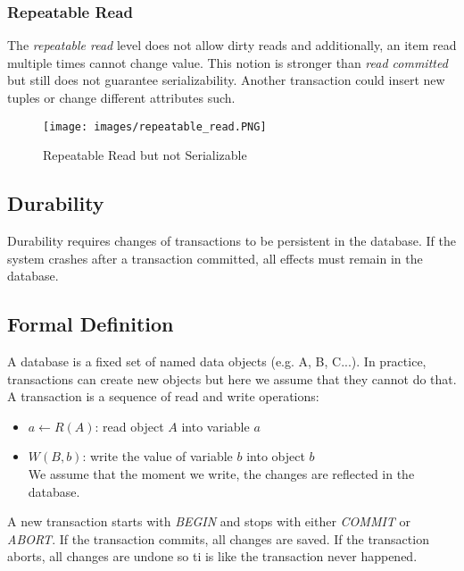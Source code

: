 \subsubsection{Repeatable Read}
The \textit{repeatable read} level does not allow dirty reads and additionally, an item read multiple times cannot change value. This notion is stronger than \textit{read committed} but still does not guarantee serializability. Another transaction could insert new tuples or change different attributes such. 
\begin{figure}[H]
\centering
\texttt{[image: images/repeatable\_read.PNG]}
\label{repeatable_read.PNG}
\caption{Repeatable Read but not Serializable}
\end{figure}

\subsection{Durability}
Durability requires changes of transactions to be persistent in the database. If the system crashes after a transaction committed, all effects must remain in the database.

\subsection{Formal Definition}
A database is a fixed set of named data objects (e.g. A, B, C...). In practice, transactions can create new objects but here we assume that they cannot do that. A transaction is a sequence of read and write operations:
\begin{itemize}
\item $a \gets R(A)$: read object $A$ into variable $a$
\item $W(B, b)$: write the value of variable $b$ into object $b$\\
We assume that the moment we write, the changes are reflected in the database.
\end{itemize}
A new transaction starts with \textit{BEGIN} and stops with either \textit{COMMIT} or \textit{ABORT}. If the transaction commits, all changes are saved. If the transaction aborts, all changes are undone so ti is like the transaction never happened.

